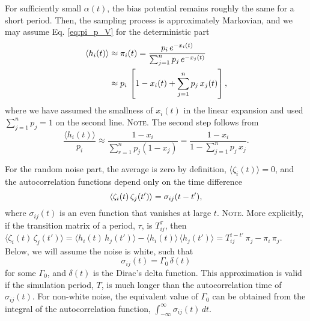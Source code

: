 \documentclass[reprint, superscriptaddress, floatfix]{revtex4-1}
\newcommand{\note}[1]{{\color{DarkGreen}\footnotesize \textsc{Note.} #1}}
\begin{document}
For sufficiently small $\alpha(t)$,
the bias potential remains roughly the same for a short period.
%
Then,
the sampling process is approximately Markovian, %
and we may assume Eq. \eqref{eq:pi_p_V}
for the deterministic part
%
\begin{align}
  \langle h_i(t) \rangle
  &\approx
  \pi_i(t)
  =
  \frac{                p_i \, e^{-x_i(t)} }
       { \sum_{j = 1}^n p_j \, e^{-x_j(t)} }
  \notag
  \\
  &\approx
  p_i \,
  \left[
    1 - x_i(t) + \sum_{j = 1}^n p_j \, x_j(t)
  \right]
  ,
  \label{eq:h_ave}
\end{align}
%
where we have assumed the smallness
of $x_i(t)$ in the linear expansion
and used $\sum_{j=1}^n p_j = 1$
on the second line.
%
\note{
The second step follows from
$$
\frac{ \langle h_i(t) \rangle }
     { p_i }
\approx
\frac{                       1 - x_i  }
     { \sum_{ r = 1 }^n p_j (1 - x_j) }
=
\frac{                       1 - x_i  }
     { 1 - \sum_{ j = 1 }^n p_j \, x_j }
.
$$
}%

%
For the random noise part,
the average is zero by definition,
$\langle \zeta_i(t) \rangle = 0$,
%
and the autocorrelation functions
depend only on the time difference
%
\begin{equation}
  \left\langle
    \zeta_i(t) \, \zeta_j(t')
  \right\rangle
  =
  \sigma_{ij}(t - t'),
  \notag
\end{equation}
%
where $\sigma_{ij}(t)$ is an even function
that vanishes at large $t$.
%
\note{More explicitly,
if the transition matrix of a period, $\tau$,
is $T^\tau_{ij}$,
then
$
  \langle \zeta_i(t) \, \zeta_j(t') \rangle
  =
  \langle h_i(t) \, h_j(t') \rangle
  -
  \langle h_i(t) \rangle \, \langle h_j(t') \rangle
  =
  T^{t - t'}_{ij} \, \pi_j - \pi_i \, \pi_j.
$
}%
Below, we will assume the noise is white,
such that
$$
\sigma_{ij}(t) = \Gamma_0 \, \delta(t)
$$
for some $\Gamma_0$,
and $\delta(t)$ is the Dirac's delta function.
%
This approximation is valid if the simulation period, $T$,
is much longer than the autocorrelation time of $\sigma_{ij}(t)$.
%
For non-white noise,
the equivalent value of $\Gamma_0$ can be obtained
from the integral of the autocorrelation function,
$\int_{-\infty}^\infty \sigma_{ij}(t) \, dt$.


%
\end{document}
